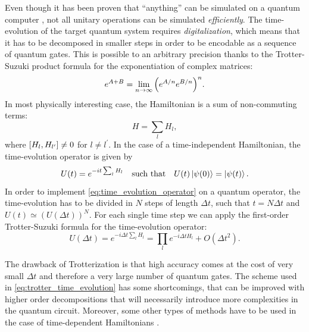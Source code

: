 \begin{figure}[t]
\end{figure}

\medskip

Even though it has been proven that ``anything'' can be simulated on a quantum computer \cite{lloyd1996simulator}, not all unitary operations can be simulated \emph{efficiently}.
The time-evolution of the target quantum system requires \emph{digitalization}, which means that it has to be decomposed in smaller steps in order to be encodable as a sequence of quantum gates.
This is possible to an arbitrary precision thanks to the Trotter-Suzuki product formula for the exponentiation of complex matrices:
\begin{equation}
    e^{A + B}  = \lim_{n \to \infty} \qty( e^{A/n} e^{B/n} )^n.
\end{equation}
In most physically interesting case, the Hamiltonian is a sum of non-commuting terms:
\begin{equation*}
    H = \sum_{l} H_{l},
\end{equation*}
where $\comm{H_l}{H_{l^{\prime}}} \neq 0$ for $l \neq l^{\prime}$.
In the case of a time-independent Hamiltonian, the time-evolution operator is given by
\begin{equation}
    U(t) = e^{-i t \sum_{l} H_l }
    \quad \text{such that} \quad
    U(t) \ket{\psi(0)} = \ket{\psi(t)}.
    \label{eq:time_evolution_operator}
\end{equation}
In order to implement \eqref{eq:time_evolution_operator} on a quantum operator, the time-evolution has to be divided in $N$ steps of length $\Delta t$, such that $t = N \Delta t$ and $U(t) \simeq (U(\Delta t))^N$.
For each single time step we can apply the first-order Trotter-Suzuki formula \cite{nielsen2010quantum, somma2002simulating} for the time-evolution operator:
\begin{equation}
    U(\Delta t)
    = e^{- i \Delta t \sum_{l} H_l}
    = \prod_{l} e^{-i \Delta t H_l} + O(\Delta t^2).
    \label{eq:trotter_time_evolution}
\end{equation}

The drawback of Trotterization is that high accuracy comes at the cost of very small $\Delta t$ and therefore a very large number of quantum gates.
The scheme used in \eqref{eq:trotter_time_evolution} has some shortcomings, that can be improved with higher order decompositions that will necessarily introduce more complexities in the quantum circuit.
Moreover, some other types of methods have to be used in the case of time-dependent Hamiltonians \cite{wiebe2011simulation}.


